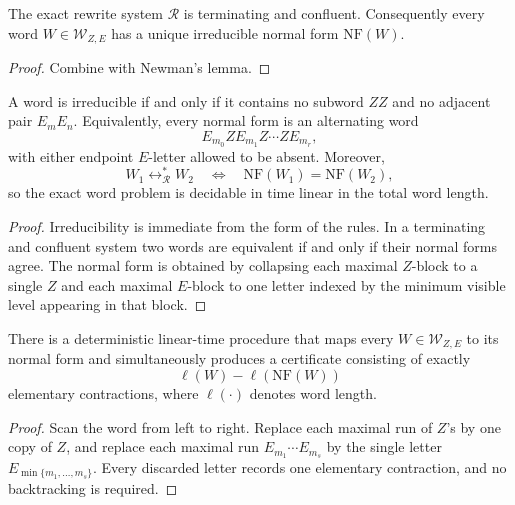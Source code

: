 \begin{theorem}
\label{thm:rewrite-confluence}
The exact rewrite system \(\mathcal R\) is terminating and confluent.
Consequently every word \(W\in\mathcal W_{Z,E}\) has a unique irreducible
normal form \(\mathrm{NF}(W)\).
\end{theorem}

\begin{proof}
Combine  with
Newman's lemma.
\end{proof}

\begin{corollary}
\label{cor:rewrite-word-problem}
A word is irreducible if and only if it contains no subword \(ZZ\) and no
adjacent pair \(E_mE_n\).  Equivalently, every normal form is an alternating
word
\[
  E_{m_0}ZE_{m_1}Z\cdots ZE_{m_r},
\]
with either endpoint \(E\)-letter allowed to be absent.  Moreover,
\[
  W_1\leftrightarrow_{\mathcal R}^* W_2
  \quad\Longleftrightarrow\quad
  \mathrm{NF}(W_1)=\mathrm{NF}(W_2),
\]
so the exact word problem is decidable in time linear in the total word length.
\end{corollary}

\begin{proof}
Irreducibility is immediate from the form of the rules.  In a terminating and
confluent system two words are equivalent if and only if their normal forms
agree.  The normal form is obtained by collapsing each maximal \(Z\)-block to a
single \(Z\) and each maximal \(E\)-block to one letter indexed by the minimum
visible level appearing in that block.
\end{proof}

\begin{proposition}
\label{prop:rewrite-algorithm}
There is a deterministic linear-time procedure that maps every
\(W\in\mathcal W_{Z,E}\) to its normal form and simultaneously produces a
certificate consisting of exactly
\[
  \ell(W)-\ell(\mathrm{NF}(W))
\]
elementary contractions, where \(\ell(\cdot)\) denotes word length.
\end{proposition}

\begin{proof}
Scan the word from left to right.  Replace each maximal run of \(Z\)'s by one
copy of \(Z\), and replace each maximal run \(E_{m_1}\cdots E_{m_s}\) by the
single letter \(E_{\min\{m_1,\dots,m_s\}}\).  Every discarded letter records
one elementary contraction, and no backtracking is required.
\end{proof}

